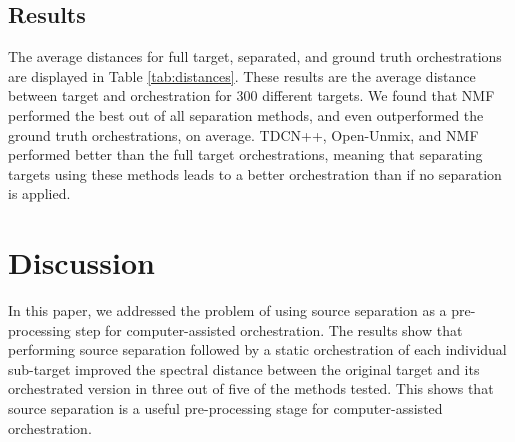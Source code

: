 \documentclass{article}
\begin{document}
  
  
    \subsection{Results}
    The average distances for full target, separated, and ground truth orchestrations are displayed in Table \ref{tab:distances}. These results are the average distance between target and orchestration for 300 different targets. We found that NMF performed the best out of all separation methods, and even outperformed the ground truth orchestrations, on average. TDCN++, Open-Unmix, and NMF performed better than the full target orchestrations, meaning that separating targets using these methods leads to a better orchestration than if no separation is applied.
  
  \section{Discussion}\label{sec:discussion}
  In this paper, we addressed the problem of using source separation as a pre-processing step for computer-assisted orchestration. The results show that performing source separation followed by a static orchestration of each individual sub-target improved the spectral distance between the original target and its orchestrated version in three out of five of the methods tested. This shows that source separation is a useful pre-processing stage for computer-assisted orchestration. 
  
\end{document}

